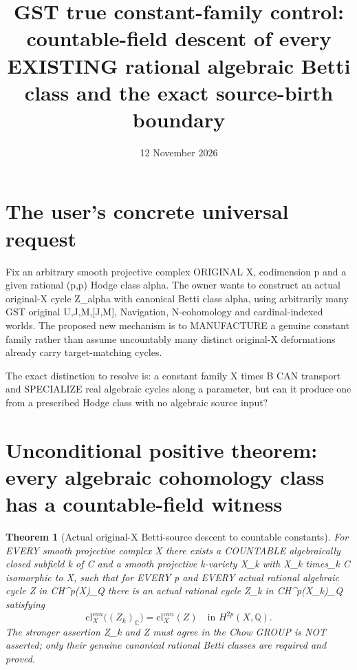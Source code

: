 \documentclass[11pt]{article}
\title{GST true constant-family control: countable-field descent of every EXISTING rational algebraic Betti class and the exact source-birth boundary}
\date{12 November 2026}
\newtheorem{theorem}{Theorem}
\begin{document}
\maketitle

\section{The user's concrete universal request}
Fix an arbitrary smooth projective complex ORIGINAL X,
codimension p and a given rational (p,p) Hodge class
alpha. The owner wants to construct an actual original-X
cycle Z_alpha with canonical Betti class alpha,
using arbitrarily many GST original U,J,M,[J,M],
Navigation, N-cohomology and cardinal-indexed worlds.
The proposed new mechanism is to MANUFACTURE
a genuine constant family rather than assume
uncountably many distinct original-X deformations
already carry target-matching cycles.

The exact distinction to resolve is:
a constant family X times B CAN transport and
SPECIALIZE real algebraic cycles along a parameter,
but can it produce one from a prescribed Hodge class
with no algebraic source input?

\section{Unconditional positive theorem: every algebraic cohomology class has a countable-field witness}
\begin{theorem}[Actual original-X Betti-source descent to countable constants]
For EVERY smooth projective complex X there exists
a COUNTABLE algebraically closed subfield
k of C and a smooth projective k-variety X_k
with X_k times_k C isomorphic to X, such that
for EVERY p and EVERY actual rational algebraic
cycle Z in CH^p(X)_Q there is an actual rational
cycle Z_k in CH^p(X_k)_Q satisfying
\[
\boxed{
\mathrm{cl}^{can}_{X}
 \bigl((Z_k)_{\mathbb C}\bigr)
 =
\mathrm{cl}^{can}_{X}(Z)
\quad\text{in }H^{2p}(X,\mathbb Q).
}
\tag{1}
\]
The stronger assertion Z_k and Z must agree
in the Chow GROUP is NOT asserted;
only their genuine canonical rational Betti classes
are required and proved.
\end{theorem}
\end{document}
